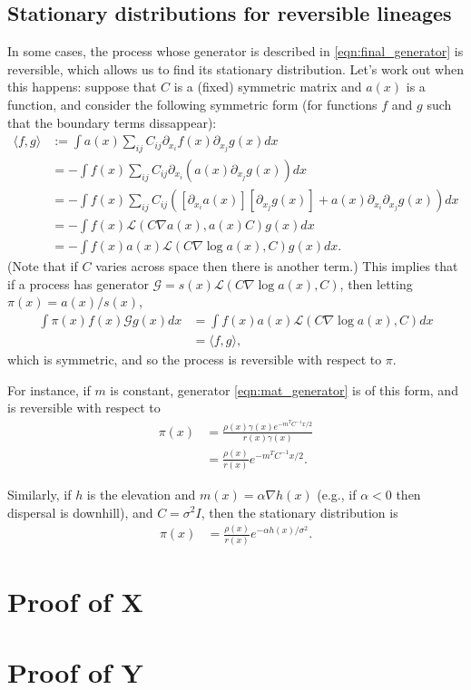 \documentclass{article}
\newcommand{\grad}{\nabla}
\newcommand{\diffop}{\mathcal{L}}
\begin{document}
\subsection{Stationary distributions for reversible lineages}

In some cases, the process whose generator is described in \eqref{eqn:final_generator}
is reversible, which allows us to find its stationary distribution.
Let's work out when this happens:
suppose that $C$ is a (fixed) symmetric matrix and $a(x)$ is a function,
and consider the following symmetric form
(for functions $f$ and $g$ such that the boundary terms dissappear):
\begin{align*}
    \langle f, g \rangle
    &:=
    \int a(x) \sum_{ij} C_{ij} \partial_{x_i} f(x) \partial_{x_j} g(x) dx \\
    &=
    - \int f(x) \sum_{ij} C_{ij} \partial_{x_i} \left( a(x) \partial_{x_j} g(x) \right) dx \\
    &=
    - \int f(x) \sum_{ij} C_{ij} \left(
        \left[\partial_{x_i} a(x)\right] \left[\partial_{x_j} g(x)\right]
        + a(x) \partial_{x_i} \partial_{x_j} g(x) \right) dx \\
    &=
    - \int f(x) \diffop\left( C \grad a(x), a(x) C \right) g(x) dx \\
    &=
    - \int f(x) a(x) \diffop\left( C \grad \log a(x), C \right) g(x) dx .
\end{align*}
(Note that if $C$ varies across space then there is another term.)
This implies that if a process has generator
$\mathcal{G} = s(x) \diffop(C \grad \log a(x), C)$,
then letting $\pi(x) = a(x) / s(x)$,
\begin{align*}
    \int \pi(x) f(x) \mathcal{G} g(x) dx
    &=
        \int f(x) a(x) \diffop\left( C \grad \log a(x), C \right) dx \\
    &=
        \langle f, g \rangle ,
\end{align*}
which is symmetric, and so the process is reversible with respect to $\pi$.

For instance, if $m$ is constant,
generator \eqref{eqn:mat_generator} is of this form,
and is reversible with respect to
\begin{align}
    \pi(x) &= \frac{\rho(x) \gamma(x) e^{-m^T C^{-1} x / 2}}{ r(x) \gamma(x) } \\
        &= \frac{\rho(x)}{r(x)} e^{-m^T C^{-1} x / 2} .
\end{align}

Similarly, if $h$ is the elevation and $m(x) = \alpha \grad h(x)$
(e.g., if $\alpha < 0$ then dispersal is downhill),
and $C = \sigma^2 I$,
then the stationary distribution is
\begin{align}
    \pi(x) &= \frac{\rho(x)}{r(x)} e^{-\alpha h(x) / \sigma^2} .
\end{align}

\section{Proof of X}

\section{Proof of Y}


\nocite{*}

\end{document}
